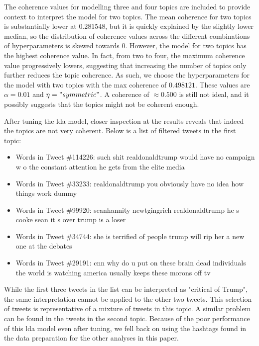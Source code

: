 \documentclass{article}
\begin{document}
  The coherence values for modelling three and four topics are
  included to provide context to interpret the model for two
  topics. The mean coherence for two topics is substantially lower at
  $0.281548$, but it is quickly explained by the slightly lower median, so
  the distribution of coherence values across the different
  combinations of hyperparameters is skewed towards $0$. However, the
  model for two topics has the highest coherence value. In fact, from
  two to four, the maximum coherence value progressively lowers,
  suggesting that increasing the number of topics only further reduces
  the topic coherence. As such, we choose the hyperparameters for the
  model with two topics with the max coherence of $0.498121$. These
  values are $\alpha = 0.01$ and $\eta = "symmetric"$. A coherence of
  $\approx 0.500$ is still not ideal, and it possibly suggests that
  the topics might not be coherent enough.
  
  After tuning the lda model, closer inspection at the results reveals
  that indeed the topics are not very coherent. Below is a list of
  filtered tweets in the first topic:

  \begin{itemize}
    \item Words in Tweet \#114226: such shit realdonaldtrump would have
      no campaign w o the constant attention he gets from the elite
      media
    \item Words in Tweet \#33233:  realdonaldtrump you obviously have
      no idea how things work dummy
    \item Words in Tweet \#99920:  seanhannity newtgingrich
      realdonaldtrump he s cooke sean it s over trump is a loser
    \item Words in Tweet \#34744: she is terrified of people trump will
      rip her a new one at the debates
    \item Words in Tweet \#29191:  cnn why do u put on these brain dead individuals the world is watching america usually keeps these morons off tv 
  \end{itemize}

  While the first three tweets in the list can be interpreted as
  "critical of Trump", the same interpretation cannot be applied to
  the other two tweets. This selection of tweets is representative of
  a mixture of tweets in this topic. A similar problem can be found in
  the tweets in the second topic. Because of the poor performance of
  this lda model even after tuning, we fell back on using the hashtags
  found in the data preparation for the other analyses in this paper.    
\end{document}
